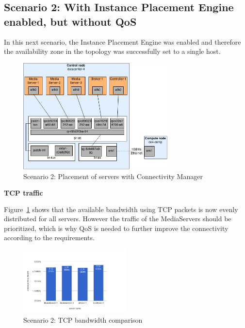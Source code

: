 \subsection{Scenario 2: With Instance Placement Engine enabled, but without QoS}

In this next scenario, the Instance Placement Engine was enabled and therefore the availability zone in the topology was successfully set to a single host.

\begin{figure}[H]
\centering

\includegraphics[width=0.7\textwidth]{images/evaluation/testbed_scenario2}

\caption{Scenario 2: Placement of servers with Connectivity Manager}
\end{figure}
\newpage
\textbf{TCP traffic}

Figure~\ref{fig:scenario2-tcp} shows that the available bandwidth using TCP packets is now evenly distributed for all servers. However the traffic of the MediaServers should be prioritized, which is why QoS is needed to further improve the connectivity according to the requirements.

\begin{figure}[H]
\centering

\includegraphics[width=0.5\textwidth]{images/evaluation/testbed_scenario2_bw}

\caption{Scenario 2: TCP bandwidth comparison}\label{fig:scenario2-tcp}
\end{figure}

